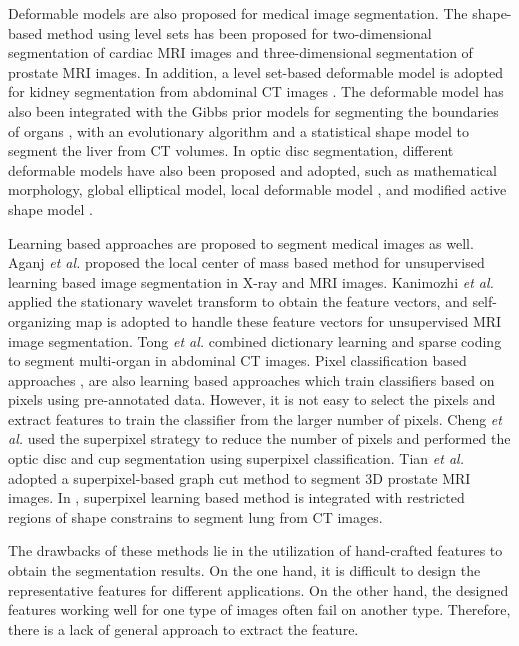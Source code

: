 \documentclass[journal]{IEEEtran}
\begin{document}
 
Deformable models are also proposed for medical image segmentation. The shape-based method using level sets \cite{tsai2003shape} has been proposed for two-dimensional segmentation of cardiac MRI images and three-dimensional segmentation of prostate MRI images. In addition, a level set-based deformable model is adopted for kidney segmentation from abdominal CT images \cite{khalifa2011new}.
The deformable model has also been integrated with the Gibbs prior models for segmenting the boundaries of organs \cite{chen2000image}, with an evolutionary algorithm and a statistical shape model to segment the liver \cite{heimann2007statistical} from CT volumes.
In optic disc segmentation, different deformable models have also been proposed and adopted, such as mathematical morphology, global elliptical model, local deformable model \cite{lowell2004optic}, and modified active shape model \cite{xu2007optic}.


Learning based approaches are proposed to segment medical images as well. 
Aganj \emph{et al.} \cite{aganj2018unsupervised} proposed the local center of mass based method for unsupervised learning based image segmentation in X-ray and MRI images. Kanimozhi \emph{et al.} \cite{kanimozhi2013brain} applied the stationary wavelet transform to obtain the feature vectors, and self-organizing map is adopted to handle these feature vectors for unsupervised MRI image segmentation. Tong \emph{et al.} \cite{tong2015discriminative} combined dictionary learning and sparse coding to segment multi-organ in abdominal CT images. Pixel classification based approaches \cite{abramoff2007automated}, \cite{cheng2013superpixel} are also learning based approaches which train classifiers based on pixels  using pre-annotated data.  However, it is not easy to select the pixels and extract features to train the classifier from the larger number of pixels. Cheng \emph{et al.} \cite{cheng2013superpixel} used the superpixel strategy to reduce the number of pixels and performed the optic disc and cup segmentation using superpixel classification.
Tian \emph{et al.} \cite{tian2016superpixel} adopted a superpixel-based graph cut method to segment 3D prostate MRI images. In \cite{kitrungrotsakul2015liver},  superpixel learning based method is integrated with restricted regions of shape constrains to segment lung from CT images.

The drawbacks of these methods lie in the utilization of hand-crafted features to obtain the segmentation results. On the one hand, it is difficult to design the representative features for different applications. On the other hand,  the designed features working well for one type of images often fail on another type. Therefore, there is a lack of general approach to extract the feature.
\end{document}
